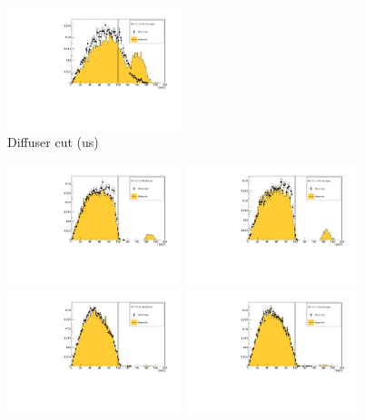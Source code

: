 \begin{figure}[!tbh]
    \includegraphics*[width=0.45\textwidth]{02-Cuts/Figures/2017-2.7_10-140_lH2_empty/global_through_virtual_diffuser_us_r_us_cut.pdf}
    \caption{Diffuser cut (us) \label{fig:diffuser_us}}
\end{figure}

\begin{figure}[!tbh]
    \centering
    \includegraphics*[width=0.45\textwidth]{02-Cuts/Figures/2017-2.7_3-140_lH2_full/global_through_virtual_diffuser_ds_r_us_cut.pdf}
    \includegraphics*[width=0.45\textwidth]{02-Cuts/Figures/2017-2.7_3-140_lH2_empty/global_through_virtual_diffuser_ds_r_us_cut.pdf}
    \includegraphics*[width=0.45\textwidth]{02-Cuts/Figures/2017-2.7_6-140_lH2_full/global_through_virtual_diffuser_ds_r_us_cut.pdf}
    \includegraphics*[width=0.45\textwidth]{02-Cuts/Figures/2017-2.7_6-140_lH2_empty/global_through_virtual_diffuser_ds_r_us_cut.pdf}

\end{figure}
